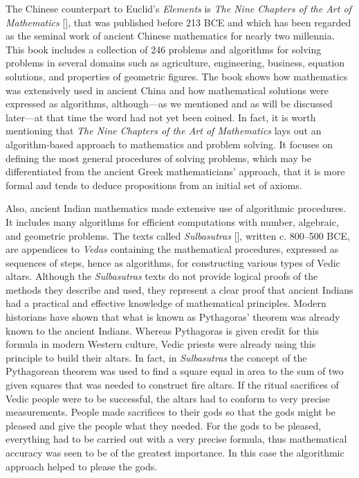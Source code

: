 {The Chinese counterpart to Euclid's \textit{Elements} is \textit{The Nine Chapters of the Art of Mathematics} [\citealt{chap:01:Kangshenetal:1999}], that was published before 213 BCE and which has been regarded as the seminal work of ancient Chinese mathematics for nearly two millennia. This book includes a collection of 246 problems and algorithms for solving problems in several domains such as agriculture, engineering, business, equation solutions, and properties of geometric figures. The book shows how mathematics was extensively used in ancient China and how mathematical solutions were expressed as algorithms, although---as we mentioned and as will be discussed later---at that time the word had not yet been coined. In fact, it is worth mentioning that \textit{The Nine Chapters of the Art of Mathematics} lays out an algorithm-based approach to mathematics and problem solving. It focuses on defining the most general procedures of solving problems, which may be differentiated from the ancient Greek mathematicians' approach, that it is more formal and tends to deduce propositions from an initial\vadjust{\vspace*{-17pt}\pagebreak} set of axioms.

Also, ancient Indian mathematics made extensive use of algorithmic procedures. It includes many algorithms for efficient computations with number, algebraic, and geometric problems. The texts called \textit{Sulbasutras} [\citealt{chap:01:Bhattacharya:2019}], written c. 800--500 BCE, are appendices to \textit{Vedas} containing the mathematical procedures, expressed as sequences of steps, hence as algorithms, for constructing various types of Vedic altars. Although the \textit{Sulbasutras} texts do not provide logical proofs of the methods they describe and used, they represent a clear proof that ancient Indians had a practical and effective knowledge of mathematical principles. Modern historians have shown that what is known as Pythagoras' theorem was already known to the ancient Indians. Whereas Pythagoras is given credit for this formula in modern Western culture, Vedic priests were already using this principle to build their altars. In fact, in \textit{Sulbasutras} the concept of the Pythagorean theorem was used to find a square equal in area to the sum of two given squares that was needed to construct fire altars. If the ritual sacrifices of Vedic people were to be successful, the altars had to conform to very precise measurements. People made sacrifices to their gods so that the gods might be pleased and give the people what they needed. For the gods to be pleased, everything had to be carried out with a very precise formula, thus mathematical accuracy was seen to be of the greatest importance. In this case the algorithmic approach helped to please the gods.

}

